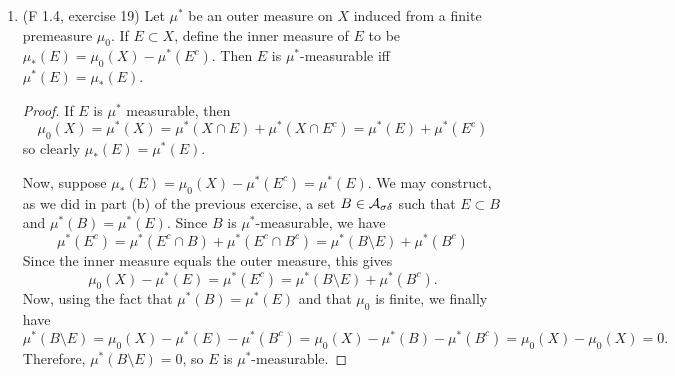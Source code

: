 \documentclass[10pt]{article}
\begin{document}
\begin{enumerate}
\begin{enumerate}
\begin{proof}
Now, suppose $E$ is $\mu^*$-measurable.  Then by closure, $E_i = E \cap X_i$ is $\mu^*$-measurable.  Since $\mu^*(E_i) < \infty$, we have $\mu(B_i \setminus E_i) = 0$, just as in part (b).  Also, $B_i \setminus E_i$ is generated by measurable sets and is hence measurable.  Next, define $B = \bigcup_1^\infty B_i$.  Then $E \subset B$, and
\begin{align*}
\mu^*(B \setminus E) &= \mu^*( \bigcup_{i=1}^\infty B_i \cap (\bigcup_{j = 1}^\infty E_i)^c) \\
&=\mu^*( \bigcup_{i=1}^\infty B_i \cap \bigcap_{j = 1}^\infty E_i^c) \\
&= \mu^*(\bigcup_{i = 1}^\infty \bigcap_{j = 1}^\infty B_j \cap E_i^c) \\
&= \mu^*(\bigcup_{i = 1}^\infty \bigcap_{j = 1}^\infty B_j \setminus E_i) \\
&= \mu^*(\bigcup_{i = 1}^\infty B_i \setminus E_i)  \text{ since } E_i \subset B_j \text{ iff } i = j \\
&= \sum_1^\infty \mu^*(B_i \setminus E_i) \\
&= 0.
\end{align*}
The other direction of the proof did not require that $\mu^*(E) < \infty$, therefore (b) holds without this restriction as long as $\mu_0$ is $\sigma$-finite.
\end{proof}

\end{enumerate}

\item (F 1.4, exercise 19) Let $\mu^*$ be an outer measure on $X$ induced from a finite premeasure $\mu_0$.  If $E \subset X$, define the inner measure of $E$ to be $\mu_*(E) = \mu_0(X) - \mu^*(E^c)$.  Then $E$ is $\mu^*$-measurable iff $\mu^*(E) = \mu_*(E)$.

\begin{proof}
If $E$ is $\mu^*$ measurable, then
$$
\mu_0(X) = \mu^*(X) = \mu^*(X \cap E) + \mu^*(X \cap E^c) = \mu^*(E) + \mu^*(E^c)
$$
so clearly $\mu_*(E) = \mu^*(E)$.

Now, suppose $\mu_*(E) = \mu_0(X) - \mu^*(E^c) = \mu^*(E)$.  We may construct, as we did in part (b) of the previous exercise, a set $B \in \mathcal{A}_{\sigma \delta}$ such that $E \subset B$ and $\mu^*(B) = \mu^*(E)$.  Since $B$ is $\mu^*$-measurable, we have
$$
\mu^*(E^c) = \mu^*(E^c \cap B) + \mu^*(E^c \cap B^c) = \mu^*(B \setminus E) + \mu^*(B^c)
$$
Since the inner measure equals the outer measure, this gives
$$
\mu_0(X) - \mu^*(E) = \mu^*(E^c) = \mu^*(B \setminus E) + \mu^*(B^c).
$$
Now, using the fact that $\mu^*(B) = \mu^*(E)$ and that $\mu_0$ is finite, we finally have
$$
\mu^*(B \setminus E) = \mu_0(X) - \mu^*(E) - \mu^*(B^c) = \mu_0(X) - \mu^*(B) - \mu^*(B^c) = \mu_0(X) - \mu_0(X) = 0.
$$
Therefore, $\mu^*(B \setminus E) = 0$, so $E$ is $\mu^*$-measurable.
\end{proof}


\end{enumerate}
\end{document}

